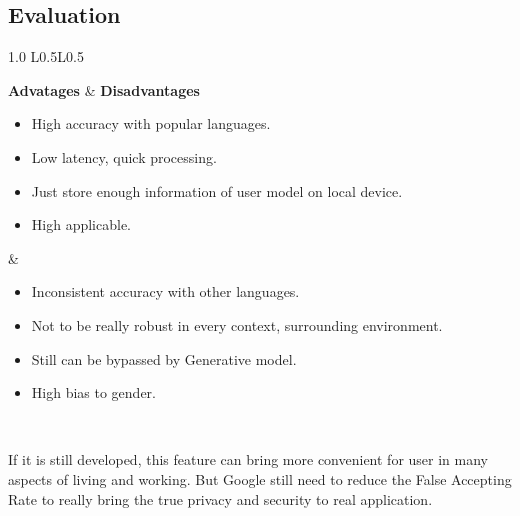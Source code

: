\subsection*{Evaluation}

\begin{table}[ht!]
	\centering
	
	\begin{tabularx}{1.0\textwidth}{ L{0.5\textwidth}L{0.5\textwidth} }
	
	\toprule
	\textbf{Advatages } &  \textbf{Disadvantages} \\
	
	\midrule

	\begin{minipage}{\linewidth}\begin{itemize}[leftmargin=10pt, labelindent=0pt, itemindent=0pt, noitemsep]
		\item High accuracy with popular languages.
		\item Low latency, quick processing. 
		\item Just store enough information of user model on local device.
		\item High applicable.
	\end{itemize}\end{minipage} & 
	\begin{minipage}{\linewidth}\begin{itemize}[leftmargin=10pt, labelindent=0pt, itemindent=0pt, noitemsep]
		\item Inconsistent accuracy with other languages.
		\item Not to be really robust in every context, surrounding environment.
		\item Still can be bypassed by Generative model.
		\item High bias to gender.
	\end{itemize}\end{minipage} \\
	
	\bottomrule
	\end{tabularx}
	
	\caption{Evaluation Voice Match}
	\label{tab:B2_1}

\end{table}

	If it is still developed, this feature can bring more convenient for user in many aspects of living and working. But Google still need to reduce the False Accepting Rate to really bring the true privacy and security to real application.
	
